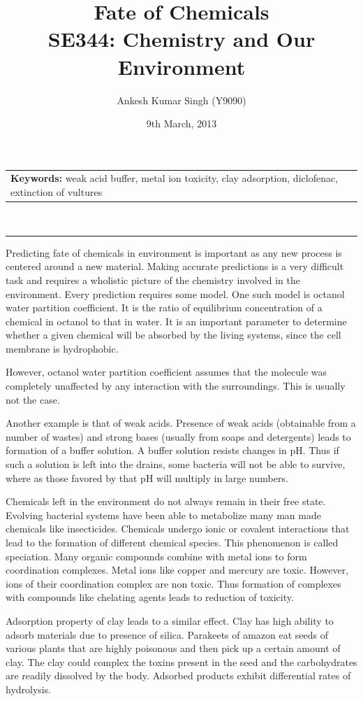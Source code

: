 \documentclass[pdftex,12pt,a4paper]{article}
\title{\vspace{-15pt}Fate of Chemicals\\ SE344: Chemistry and Our Environment}
\author{Ankesh Kumar Singh (Y9090)}
\date{9th March, 2013}
\begin{document}
\maketitle
\begin{tabular}{p{370pt}}
\textbf{Keywords: }weak acid buffer, metal ion toxicity, clay adsorption, diclofenac, extinction of vultures
\end{tabular}
\vspace{10pt}\\
\hrule
\vspace{10pt}
Predicting fate of chemicals in environment is important as any new process is centered around a new material. Making accurate predictions is a very difficult task and requires a wholistic picture of the chemistry involved in the environment. Every prediction requires some model. One such model is octanol water partition coefficient. It is the ratio of equilibrium concentration of a chemical in octanol to that in water. It is an important parameter to determine whether a given chemical will be absorbed by the living systems, since the cell membrane is hydrophobic.

However, octanol water partition coefficient assumes that the molecule was completely unaffected by any interaction with the surroundings. This is usually not the case.

Another example is that of weak acids. Presence of weak acids (obtainable from a number of wastes) and strong bases (usually from soaps and detergents) leads to formation of a buffer solution. A buffer solution resists changes in pH. Thus if such a solution is left into the drains, some bacteria will not be able to survive, where as those favored by that pH will multiply in large numbers.

Chemicals left in the environment do not always remain in their free state. Evolving bacterial systems have been able to metabolize many man made chemicals like insecticides. Chemicals undergo ionic or covalent interactions that lead to the formation of different chemical species. This phenomenon is called speciation. Many organic compounds combine with metal ions to form coordination complexes. Metal ions like copper and mercury are toxic. However, ions of their coordination complex are non toxic. Thus formation of complexes with compounds like chelating agents leads to reduction of toxicity.

Adsorption property of clay leads to a similar effect. Clay has high ability to adsorb materials due to presence of silica. Parakeets of amazon eat seeds of various plants that are highly poisonous and then pick up a certain amount of clay. The clay could complex the toxins present in the seed and the carbohydrates are readily dissolved by the body. Adsorbed products exhibit differential rates of hydrolysis.
\end{document}
